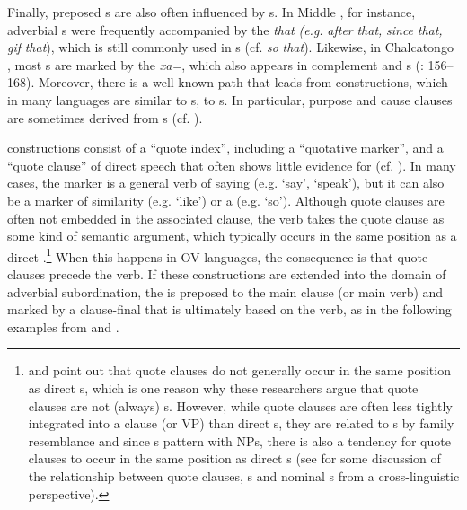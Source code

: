 \documentclass[output=paper]{langsci/langscibook}
\begin{document}
Finally, preposed s are also often influenced by s. In Middle , for instance, adverbial s were frequently accompanied by the  \textit{that} \textit{(e.g.} \textit{after} \textit{that,} \textit{since} \textit{that,} \textit{gif} \textit{that}), which is still commonly used in s (cf. \textit{so} \textit{that}). Likewise, in Chalcatongo , most s are marked by the  \textit{xa=}, which also appears in complement and s (\citealt{Macaulay1996}: 156--168). Moreover, there is a well-known path that leads from  constructions, which in many languages are similar to s, to s. In particular, purpose and cause clauses are sometimes derived from s (cf. \citealt{Güldemann2008}). 

 constructions consist of a “quote index”, including a “quotative mark\-er”, and a “quote clause” of direct speech that often shows little evidence for  (cf. \citealt{Güldemann2008}). In many cases, the  marker is a general verb of saying (e.g. ‘say’, ‘speak’), but it can also be a marker of similarity (e.g. ‘like’) or a   (e.g. ‘so’). Although quote clauses are often not embedded in the associated clause, the  verb takes the quote clause as some kind of semantic argument, which typically occurs in the same position as a direct .\footnote{\citet{Munro1982} and \citet{Güldemann2008} point out that quote clauses do not generally occur in the same position as direct s, which is one reason why these researchers argue that quote clauses are not (always) s. However, while quote clauses are often less tightly integrated into a clause (or VP) than direct s, they are related to  s by family resemblance and since  s pattern with  NPs, there is also a tendency for quote clauses to occur in the same position as direct s (see \citealt{Schmidtke-BodeDiessel2017} for some discussion of the relationship between quote clauses,  s and nominal s from a cross-linguistic perspective).} When this happens in OV languages, the consequence is that quote clauses precede the  verb. If these constructions are extended into the domain of adverbial subordination, the  is preposed to the main clause (or main verb) and marked by a clause-final  that is ultimately based on the  verb, as in the following examples from   and  .
\end{document}
